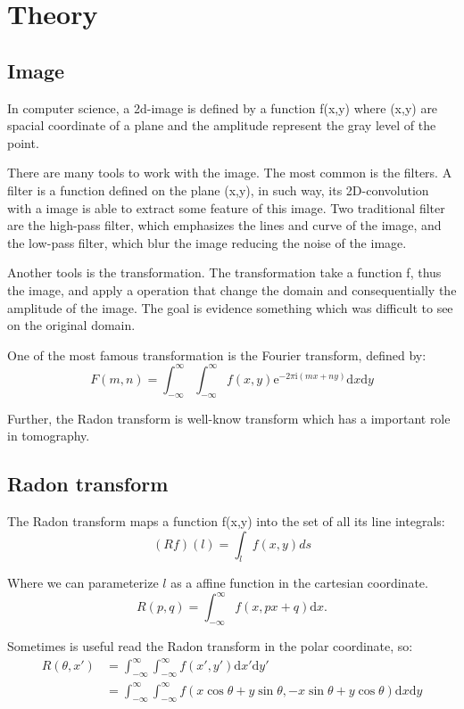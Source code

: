\chapter{Theory}
\section{Image}

In computer science, a 2d-image is defined by a function f(x,y) where (x,y) are spacial coordinate of a plane and the amplitude represent the gray level of the point.

There are many tools to work with the image. The most common is the filters. A filter is a function defined on the plane (x,y), in such way, its 2D-convolution with a image is able to extract some feature of this image. Two traditional filter are the high-pass filter, which emphasizes the lines and curve of the image, and the low-pass filter, which blur the image reducing the noise of the image.

Another tools is the transformation. The transformation take a function f, thus the image, and apply a operation that change the domain and consequentially the amplitude of the image. The goal is evidence something which was difficult to see on the original domain.

One of the most famous transformation is the Fourier transform, defined by:
\begin{equation}\label{Fourier}
F(m,n) = \int_{-\infty}^\infty{\int_{-\infty}^\infty {f(x,y)\mathrm{e}^{-2\pi\mathrm{i}(mx+ny)} \mathrm{d}x} \mathrm{d}y}
\end{equation}

Further, the Radon transform is well-know transform which has a important role in tomography.


\section{Radon transform}

The Radon transform maps a function f(x,y) into the set of all its line integrals:
\[(Rf)(l) = \int_l{f(x,y)ds}\]

Where we can parameterize $l$ as a affine function in the cartesian coordinate.
\[ R(p,q) = \int_{-\infty}^\infty {f(x,px+q) \mathrm{d}x}. \]

Sometimes is useful read the Radon transform in the polar coordinate, so:
\begin{align} 
R(\theta,x') &= \int_{-\infty}^\infty \int_{-\infty}^\infty {f(x',y') \mathrm{d}x'\mathrm{d}y'} \nonumber \\
&= \int_{-\infty}^\infty \int_{-\infty}^\infty {f(x\cos\theta+y\sin\theta,-x\sin\theta+y\cos\theta) \mathrm{d}x\mathrm{d}y } \label{Radon}
\end{align}

